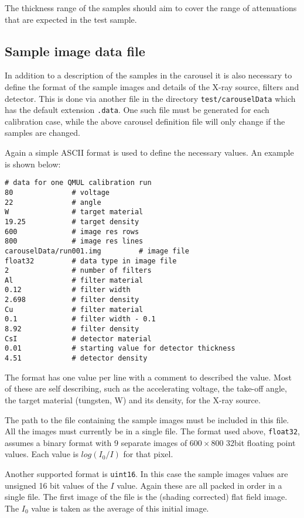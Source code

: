 \documentclass[a4paper]{article}
\begin{document}
The thickness range of the samples should aim to cover the range of attenuations that are expected in the test sample.

\subsection{Sample image data file}

In addition to a description of the samples in the carousel it is also necessary to define the format of the sample
images and details of the X-ray source, filters and detector.
This is done via another file in the directory \texttt{test/carouselData} which has the default extension \texttt{.data}.
One such file must be generated for each calibration case, while the above carousel definition file will only change
if the samples are changed.

Again a simple ASCII format is used to define the necessary values.
An example is shown below:
\begin{verbatim}
# data for one QMUL calibration run
80              # voltage
22              # angle
W               # target material
19.25           # target density
600             # image res rows
800             # image res lines
carouselData/run001.img         # image file
float32         # data type in image file
2               # number of filters
Al              # filter material
0.12            # filter width
2.698           # filter density
Cu              # filter material
0.1             # filter width - 0.1
8.92            # filter density
CsI             # detector material
0.01            # starting value for detector thickness
4.51            # detector density
\end{verbatim}

The format has one value per line with a comment to described the value.
Most of these are self describing, such as the accelerating voltage, the take-off angle,
the target material (tungsten, W) and its density, for the X-ray source.

The path to the file containing the sample images must be included in this file.
All the images must currently be in a single file.
The format used above, \texttt{float32}, assumes a binary format with 9 separate images of $600 \times 800$ 32bit floating
point values.
Each value is $log ( I_0 / I )$ for that pixel.

Another supported format is \texttt{uint16}. In this case the sample images values are unsigned 16 bit values of the $I$ value.
Again these are all packed in order in a single file. The first image of the file is the (shading corrected) flat field image.
The $I_0$ value is taken as the average of this initial image.
 
\end{document}
